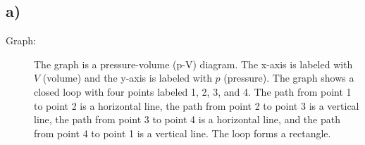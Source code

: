 

\subsection*{a)}

\begin{description}
    \item[Graph:] The graph is a pressure-volume (p-V) diagram. The x-axis is labeled with $V$ (volume) and the y-axis is labeled with $p$ (pressure). The graph shows a closed loop with four points labeled 1, 2, 3, and 4. The path from point 1 to point 2 is a horizontal line, the path from point 2 to point 3 is a vertical line, the path from point 3 to point 4 is a horizontal line, and the path from point 4 to point 1 is a vertical line. The loop forms a rectangle.
\end{description}